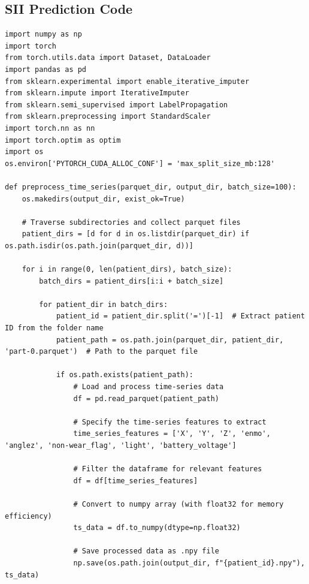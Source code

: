 \begin{appendices}
    \pagebreak
    \section{SII Prediction Code}
    \begin{mdframed}
    \begin{lstlisting}[breaklines=true]
        import numpy as np
import torch
from torch.utils.data import Dataset, DataLoader
import pandas as pd
from sklearn.experimental import enable_iterative_imputer 
from sklearn.impute import IterativeImputer
from sklearn.semi_supervised import LabelPropagation
from sklearn.preprocessing import StandardScaler
import torch.nn as nn
import torch.optim as optim
import os
os.environ['PYTORCH_CUDA_ALLOC_CONF'] = 'max_split_size_mb:128'

def preprocess_time_series(parquet_dir, output_dir, batch_size=100):
    os.makedirs(output_dir, exist_ok=True)

    # Traverse subdirectories and collect parquet files
    patient_dirs = [d for d in os.listdir(parquet_dir) if os.path.isdir(os.path.join(parquet_dir, d))]

    for i in range(0, len(patient_dirs), batch_size):
        batch_dirs = patient_dirs[i:i + batch_size]
        
        for patient_dir in batch_dirs:
            patient_id = patient_dir.split('=')[-1]  # Extract patient ID from the folder name
            patient_path = os.path.join(parquet_dir, patient_dir, 'part-0.parquet')  # Path to the parquet file
            
            if os.path.exists(patient_path):
                # Load and process time-series data
                df = pd.read_parquet(patient_path)
                
                # Specify the time-series features to extract
                time_series_features = ['X', 'Y', 'Z', 'enmo', 'anglez', 'non-wear_flag', 'light', 'battery_voltage']
                
                # Filter the dataframe for relevant features
                df = df[time_series_features]
                
                # Convert to numpy array (with float32 for memory efficiency)
                ts_data = df.to_numpy(dtype=np.float32)
                
                # Save processed data as .npy file
                np.save(os.path.join(output_dir, f"{patient_id}.npy"), ts_data)



\end{lstlisting}
\end{mdframed}
\end{appendices}
